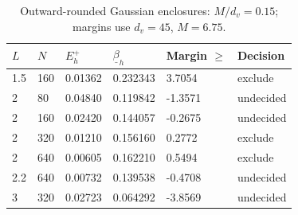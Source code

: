 \begin{table}[htbp]
\centering
\caption{Outward-rounded Gaussian enclosures: $M/d_v=0.15$; margins use $d_v=45$, $M=6.75$.}
\label{tab:certificates}
\begin{tabular}{llllll}
\toprule
$L$ & $N$ & $E_h^+$ & $\underline\beta_h$ & Margin $\geq$ & Decision \\
\midrule
1.5 & 160 & 0.01362 & 0.232343 & 3.7054 & exclude \\
2 & 80 & 0.04840 & 0.119842 & -1.3571 & undecided \\
2 & 160 & 0.02420 & 0.144057 & -0.2675 & undecided \\
2 & 320 & 0.01210 & 0.156160 & 0.2772 & exclude \\
2 & 640 & 0.00605 & 0.162210 & 0.5494 & exclude \\
2.2 & 640 & 0.00732 & 0.139538 & -0.4708 & undecided \\
3 & 320 & 0.02723 & 0.064292 & -3.8569 & undecided \\
\bottomrule
\end{tabular}
\end{table}
